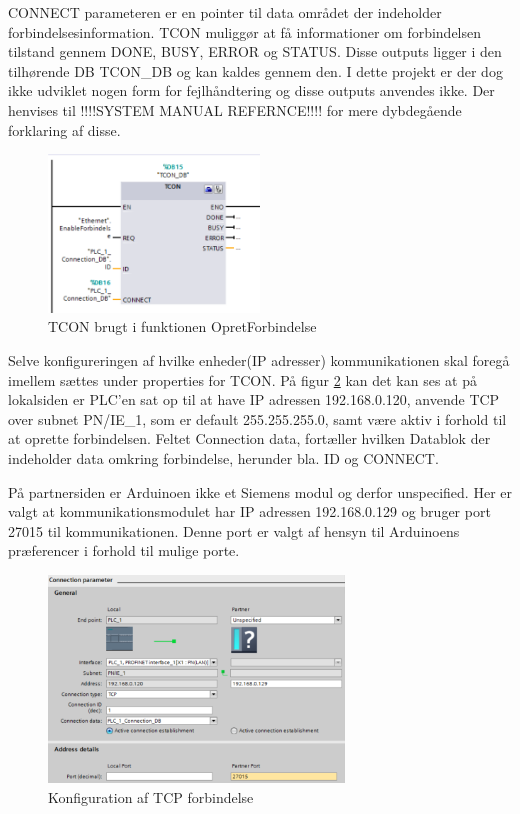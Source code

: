 CONNECT parameteren er en pointer til data området der indeholder forbindelsesinformation. TCON muliggør at få informationer om forbindelsen tilstand gennem DONE, BUSY, ERROR og STATUS. Disse outputs ligger i den tilhørende DB TCON\_DB og kan kaldes gennem den. I dette projekt er der dog ikke udviklet nogen form for fejlhåndtering og disse outputs anvendes ikke. Der henvises til !!!!SYSTEM MANUAL REFERNCE!!!! for mere dybdegående forklaring af disse.

\begin{figure}[H] %
	\centering
	\includegraphics[width=0.5\textwidth]{Figure/TCON}
	\caption{TCON brugt i funktionen OpretForbindelse}
	\label{fig:TCON}
\end{figure}

Selve konfigureringen af hvilke enheder(IP adresser) kommunikationen skal foregå imellem sættes under properties for TCON. På figur \ref{fig:Konfiguration} kan det kan ses at på lokalsiden er PLC'en sat op til at have IP adressen 192.168.0.120, anvende TCP over subnet PN/IE\_1, som er default 255.255.255.0, samt være aktiv i forhold til at oprette forbindelsen. Feltet Connection data, fortæller hvilken Datablok der indeholder data omkring forbindelse, herunder bla. ID og CONNECT.

På partnersiden er Arduinoen ikke et Siemens modul og derfor unspecified. Her er valgt at kommunikationsmodulet har IP adressen 192.168.0.129 og bruger port 27015 til kommunikationen. Denne port er valgt af hensyn til Arduinoens præferencer i forhold til mulige porte.

\begin{figure}[H] %
	\centering
	\includegraphics[width=0.7\textwidth]{Figure/KonfigurationAfTCPforbindelse}
	\caption{Konfiguration af TCP forbindelse}
	\label{fig:Konfiguration}
\end{figure}

